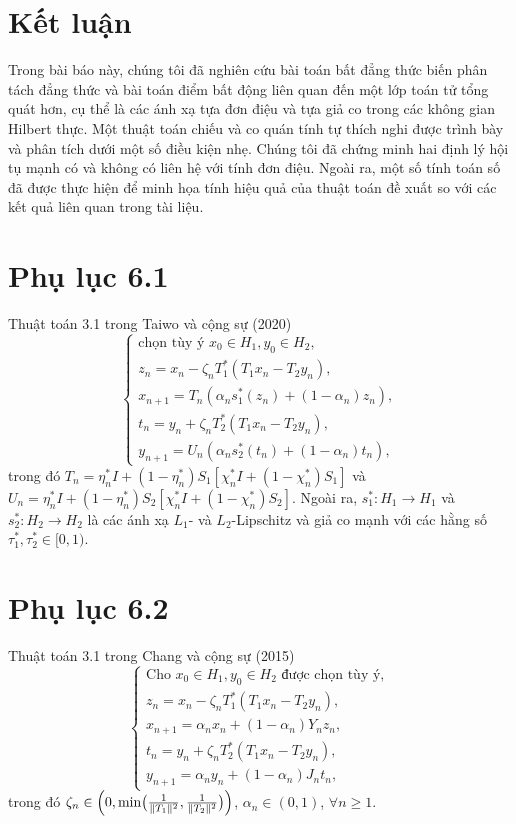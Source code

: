 \documentclass[11pt,a4paper]{article}
\theoremstyle{plain}
\theoremstyle{definition}
\theoremstyle{remark}
\numberwithin{equation}{section}
\newcommand{\nm}[1]{\lVert #1\rVert}
\begin{document}
\section{Kết luận}\label{sec:concl}

Trong bài báo này, chúng tôi đã nghiên cứu bài toán bất đẳng thức biến phân tách đẳng thức và bài toán điểm bất động liên quan đến một lớp toán tử tổng quát hơn, cụ thể là các ánh xạ tựa đơn điệu và tựa giả co trong các không gian Hilbert thực. Một thuật toán chiếu và co quán tính tự thích nghi được trình bày và phân tích dưới một số điều kiện nhẹ. Chúng tôi đã chứng minh hai định lý hội tụ mạnh có và không có liên hệ với tính đơn điệu. Ngoài ra, một số tính toán số đã được thực hiện để minh họa tính hiệu quả của thuật toán đề xuất so với các kết quả liên quan trong tài liệu.

\section*{Phụ lục 6.1}

Thuật toán 3.1 trong Taiwo và cộng sự (2020)
\[
\begin{cases}
\text{chọn tùy ý } x_0\in H_1, y_0\in H_2,\\
z_n=x_n-\zeta_n T_1^{*}(T_1x_n-T_2y_n),\\
x_{n+1}=T_n(\alpha_n s_1^{*}(z_n)+(1-\alpha_n)z_n),\\
t_n=y_n+\zeta_n T_2^{*}(T_1x_n-T_2y_n),\\
y_{n+1}=U_n(\alpha_n s_2^{*}(t_n)+(1-\alpha_n)t_n),
\end{cases}
\]
trong đó $T_n=\eta_n^{*}I+(1-\eta_n^{*})S_1[\chi_n^{*}I+(1-\chi_n^{*})S_1]$ và $U_n=\eta_n^{*}I+(1-\eta_n^{*})S_2[\chi_n^{*}I+(1-\chi_n^{*})S_2]$. Ngoài ra, $s_1^{*}:H_1\to H_1$ và $s_2^{*}:H_2\to H_2$ là các ánh xạ $L_1$- và $L_2$-Lipschitz và giả co mạnh với các hằng số $\tau_1^{*},\tau_2^{*}\in[0,1)$.

\section*{Phụ lục 6.2}

Thuật toán 3.1 trong Chang và cộng sự (2015)
\[
\begin{cases}
\text{Cho } x_0\in H_1, y_0\in H_2 \text{ được chọn tùy ý},\\
z_n=x_n-\zeta_n T_1^{*}(T_1x_n-T_2y_n),\\
x_{n+1}=\alpha_n x_n+(1-\alpha_n)Y_n z_n,\\
t_n=y_n+\zeta_n T_2^{*}(T_1x_n-T_2y_n),\\
y_{n+1}=\alpha_n y_n+(1-\alpha_n)J_n t_n,
\end{cases}
\]
trong đó $\zeta_n\in\Bigl(0,\min\bigl(\tfrac{1}{\nm{T_1}^2},\tfrac{1}{\nm{T_2}^2}\bigr)\Bigr)$, $\alpha_n\in(0,1)$, $\forall n\ge 1$.
\end{document}
